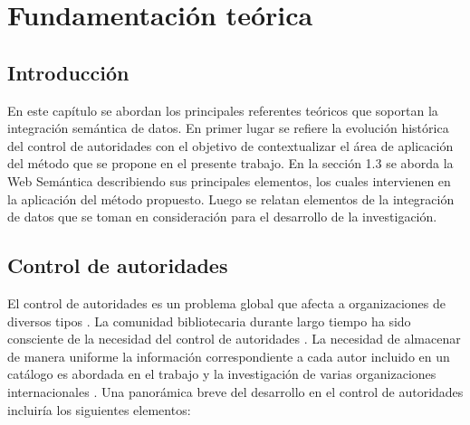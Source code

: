 \chapter{\large Fundamentación teórica}

\pagestyle{fancy}
\lhead{}
\chead{}
\lfoot{}
\cfoot{}
\rfoot{\thepage}
\renewcommand{\headrulewidth}{0.4pt}
 \vspace{-1cm}

\section{Introducción}
En este capítulo se abordan los principales referentes teóricos que soportan la integración semántica de datos. En primer lugar se refiere la evolución histórica del control de autoridades con el objetivo de contextualizar el área de aplicación del método que se propone en el presente trabajo. En la sección 1.3 se aborda la Web Semántica describiendo sus principales elementos, los cuales intervienen en la aplicación del método propuesto. Luego se relatan elementos de la integración de datos que se toman en consideración para el desarrollo de la investigación.
\section{Control de autoridades}
El control de autoridades es un problema global que afecta a organizaciones de diversos tipos \citep{Leiva-Mederos2013}. La comunidad bibliotecaria durante largo tiempo ha sido consciente de la necesidad del control de autoridades \citep{Harper2007,Tillett2009,Leiva-Mederos2013,Carrasco2016}. La necesidad de almacenar de manera uniforme la información correspondiente a cada autor incluido en un catálogo es abordada en el trabajo y la investigación de varias organizaciones internacionales \citep{Leiva-Mederos2013}. Una panorámica breve del desarrollo en el control de autoridades incluiría los siguientes elementos:

